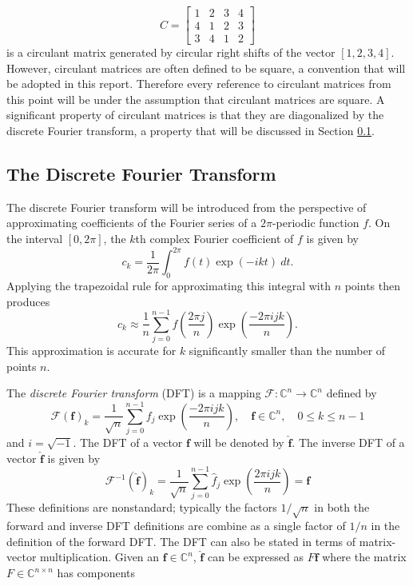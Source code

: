 \documentclass[12pt]{article}
\begin{document}
\[C = \begin{bmatrix}
1 & 2 & 3 & 4 \\
4 & 1 & 2 & 3 \\
3 & 4 & 1 & 2
\end{bmatrix}\] 
is a circulant matrix generated by circular right shifts of the vector $[1,2,3,4]$. However, circulant matrices are often defined to be square, a convention that will be adopted in this report. Therefore every reference to circulant matrices from this point will be under the assumption that circulant matrices are square. A significant property of circulant matrices is that they are diagonalized by the discrete Fourier transform, a property that will be discussed in Section \ref{sec:The Discrete Fourier Transform}.

\subsection{The Discrete Fourier Transform} \label{sec:The Discrete Fourier Transform}
The discrete Fourier transform will be introduced from the perspective of approximating coefficients of the Fourier series of a $2\pi$-periodic function $f$. On the interval $[0,2\pi]$, the $k$th complex Fourier coefficient of $f$ is given by
\[c_k = \frac{1}{2\pi}\int_0^{2\pi} f(t)\exp(-ikt)\:dt.\]
Applying the trapezoidal rule for approximating this integral with $n$ points then produces
\[c_k \approx \frac{1}{n}\sum_{j = 0}^{n-1} f\left(\frac{2\pi{j}}{n}\right)\exp\left(\frac{-2\pi{ijk}}{n}\right).\]
This approximation is accurate for $k$ significantly smaller than the number of points $n$. \par 
The \textit{discrete Fourier transform} (DFT) is a mapping $\mathcal{F}:\mathbb{C}^n \rightarrow \mathbb{C}^n$ defined by
\begin{equation}
\mathcal{F}(\mathbf{f})_k = \frac{1}{\sqrt{n}}\sum_{j=0}^{n-1} f_{j}\exp\left(\frac{-2\pi{ijk}}{n}\right), \quad \mathbf{f}\in\mathbb{C}^n, \quad 0 \leq k \leq n-1
\label{eq:DFT}
\end{equation}
and $i = \sqrt{-1}$. The DFT of a vector $\mathbf{f}$ will be denoted by $\widehat{\mathbf{f}}$. The inverse DFT of a vector $\widehat{\mathbf{f}}$ is given by
\begin{equation}
\mathcal{F}^{-1}(\widehat{\mathbf{f}})_k = \frac{1}{\sqrt{n}}\sum_{j=0}^{n-1} \widehat{f}_j\exp\left(\frac{2\pi{ijk}}{n}\right) = \mathbf{f}
\end{equation}
These definitions are nonstandard; typically the factors $1/\sqrt{n}$ in both the forward and inverse DFT definitions are combine as a single factor of $1/n$ in the definition of the forward DFT. The DFT can also be stated in terms of matrix-vector multiplication. Given an $\mathbf{f} \in \mathbb{C}^n$, $\widehat{\mathbf{f}}$ can be expressed as $F\mathbf{f}$ where the matrix $F\in\mathbb{C}^{n\times{n}}$ has components
\end{document}
